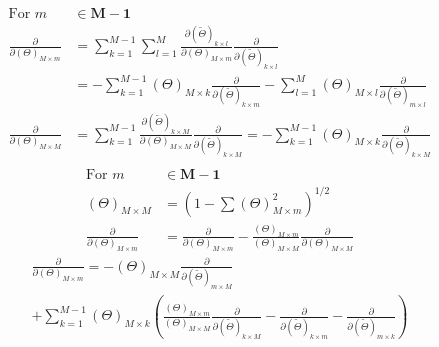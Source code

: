 \documentclass[preprint,12pt]{elsarticle}
\newcommand*{\M}[1]{\ensuremath{#1}\xspace}
\newcommand*{\vr}[1]{\M{\mathbf{#1}}}
\newcommand{\T}[1]{\text{#1}}
\begin{document}
            \begin{equation} \label{eq:Method:BO:derivAdjust}
                \begin{aligned}
                    \T{For } m & \in \vr{M-1} \\
                    \frac{\partial}{\partial(\Theta)_{M\times m}} 
                    &= \sum_{k=1}^{M-1} \sum_{l=1}^{M}\frac{\partial (\tilde{\Theta})_{k\times l}}{\partial(\Theta)_{M\times m}} \frac{\partial}{\partial (\tilde{\Theta})_{k\times l}} \\
                    &= -\sum_{k=1}^{M-1} (\Theta)_{M\times k} \frac{\partial}{\partial (\tilde{\Theta})_{k\times m}} 
                    - \sum_{l=1}^{M} (\Theta)_{M\times l} \frac{\partial}{\partial (\tilde{\Theta})_{m\times l}} \\
                    \frac{\partial}{\partial(\Theta)_{M\times M}} 
                    &= \sum_{k=1}^{M-1} \frac{\partial (\tilde{\Theta})_{k\times M}}{\partial(\Theta)_{M\times M}} \frac{\partial}{\partial (\tilde{\Theta})_{k\times M}} 
                    = - \sum_{k=1}^{M-1} (\Theta)_{M\times k} \frac{\partial}{\partial (\tilde{\Theta})_{k\times M}} \\
                \end{aligned}
            \end{equation}
            \begin{equation} \label{eq:Method:BO:derivAdjust}
                \begin{aligned}
                    \T{For } m & \in \vr{M-1}  \\
                    (\Theta)_{M\times M} &= \left(1 - \sum (\Theta)_{M\times m}^{2}\right)^{1/2} \\
                    \frac{\partial}{\partial(\Theta)_{M\times m}} &= \frac{\partial}{\partial(\Theta)_{M\times m}} - 
                    \frac{(\Theta)_{M \times m}}{(\Theta)_{M \times M}}\frac{\partial}{\partial(\Theta)_{M\times M}}
                \end{aligned}
            \end{equation}
            \begin{multline} \label{eq:Method:BO:derivAdjust}
                \frac{\partial}{\partial(\Theta)_{M\times m}} 
                = -(\Theta)_{M\times M} \frac{\partial}{\partial (\tilde{\Theta})_{m\times M}} \\
                + \sum_{k=1}^{M-1} (\Theta)_{M\times k} 
                \left(\frac{(\Theta)_{M \times m}}{(\Theta)_{M \times M}}\frac{\partial}{\partial(\tilde{\Theta})_{k\times M}}
                -\frac{\partial}{\partial (\tilde{\Theta})_{k\times m}}-\frac{\partial}{\partial (\tilde{\Theta})_{m\times k}} \right)
            \end{multline}
\end{document}
